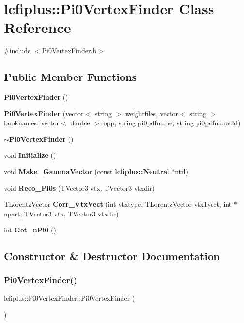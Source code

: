 \section{lcfiplus\+:\+:Pi0\+Vertex\+Finder Class Reference}
\label{classlcfiplus_1_1Pi0VertexFinder}


{\ttfamily \#include $<$Pi0\+Vertex\+Finder.\+h$>$}

\subsection*{Public Member Functions}
\begin{DoxyCompactItemize}
\item 
\textbf{ Pi0\+Vertex\+Finder} ()
\item 
\textbf{ Pi0\+Vertex\+Finder} (vector$<$ string $>$ weightfiles, vector$<$ string $>$ booknames, vector$<$ double $>$ opp, string pi0pdfname, string pi0pdfname2d)
\item 
\textbf{ $\sim$\+Pi0\+Vertex\+Finder} ()
\item 
void \textbf{ Initialize} ()
\item 
void \textbf{ Make\+\_\+\+Gamma\+Vector} (const \textbf{ lcfiplus\+::\+Neutral} $\ast$ntrl)
\item 
void \textbf{ Reco\+\_\+\+Pi0s} (T\+Vector3 vtx, T\+Vector3 vtxdir)
\item 
T\+Lorentz\+Vector \textbf{ Corr\+\_\+\+Vtx\+Vect} (int vtxtype, T\+Lorentz\+Vector vtx1vect, int $\ast$npart, T\+Vector3 vtx, T\+Vector3 vtxdir)
\item 
int \textbf{ Get\+\_\+n\+Pi0} ()
\end{DoxyCompactItemize}


\subsection{Constructor \& Destructor Documentation}
\mbox{\label{classlcfiplus_1_1Pi0VertexFinder_ae23e54157e2dc48ea59f7d6f836b1f48}} 
\subsubsection{Pi0\+Vertex\+Finder()\hspace{0.1cm}{\footnotesize\ttfamily [1/2]}}
{\footnotesize\ttfamily lcfiplus\+::\+Pi0\+Vertex\+Finder\+::\+Pi0\+Vertex\+Finder (\begin{DoxyParamCaption}{ }\end{DoxyParamCaption})}

